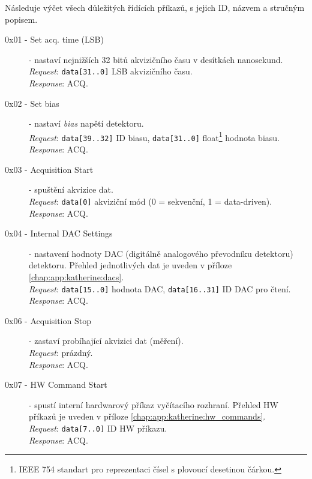 Následuje výčet všech důležitých řídících příkazů, s jejich ID, názvem a stručným popisem.

\begin{description}
    \item[0x01 - Set acq. time (LSB)] - nastaví nejnižších 32 bitů akvizičního času v desítkách nanosekund.
    \\\textit{Request}: \texttt{data[31..0]} LSB akvizičního času.
    \\\textit{Response}: ACQ.

    \item[0x02 - Set bias] - nastaví \textit{bias} napětí detektoru.
    \\\textit{Request}: \texttt{data[39..32]} ID biasu, \texttt{data[31..0]} float\footnote{IEEE 754 standart pro reprezentaci čísel s plovoucí desetinou čárkou.} hodnota biasu.
    \\\textit{Response}: ACQ.
    
    \item[0x03 - Acquisition Start] - spuštění akvizice dat.
    \\\textit{Request}: \texttt{data[0]} akviziční mód (0 = sekvenční, 1 = data-driven).
    \\\textit{Response}: ACQ.
    
    \item[0x04 - Internal DAC Settings] - nastavení hodnoty DAC (digitálně analogového převodníku detektoru) detektoru. Přehled jednotlivých dat je uveden v příloze \ref{chap:app:katherine:dacs}.
    \\\textit{Request}: \texttt{data[15..0]} hodnota DAC, \texttt{data[16..31]} ID DAC pro čtení.
    \\\textit{Response}: ACQ.

    
    \item[0x06 - Acquisition Stop] - zastaví probíhající akvizici dat (měření).
    \\\textit{Request}: prázdný.
    \\\textit{Response}: ACQ.
    
    \item[0x07 - HW Command Start] - spustí interní hardwarový příkaz vyčítacího rozhraní. Přehled HW příkazů je uveden v příloze \ref{chap:app:katherine:hw_commands}.
    \\\textit{Request}: \texttt{data[7..0]} ID HW příkazu.
    \\\textit{Response}: ACQ.


\end{description}
